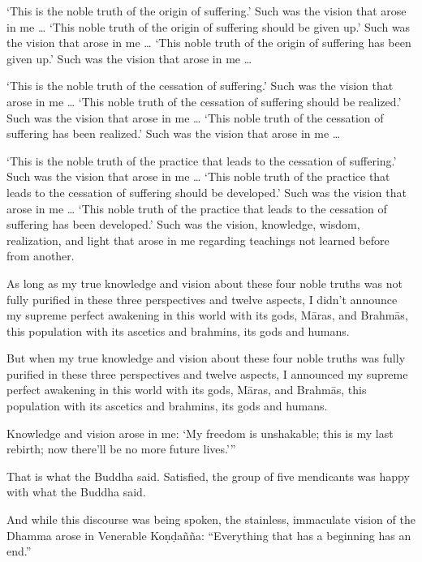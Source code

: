 \documentclass[12pt,openany]{book}%
\begin{document}
‘This is the noble truth of the origin of suffering.’ Such was the vision that arose in me … ‘This noble truth of the origin of suffering should be given up.’ Such was the vision that arose in me … ‘This noble truth of the origin of suffering has been given up.’ Such was the vision that arose in me … 

‘This is the noble truth of the cessation of suffering.’ Such was the vision that arose in me … ‘This noble truth of the cessation of suffering should be realized.’ Such was the vision that arose in me … ‘This noble truth of the cessation of suffering has been realized.’ Such was the vision that arose in me … 

‘This is the noble truth of the practice that leads to the cessation of suffering.’ Such was the vision that arose in me … ‘This noble truth of the practice that leads to the cessation of suffering should be developed.’ Such was the vision that arose in me … ‘This noble truth of the practice that leads to the cessation of suffering has been developed.’ Such was the vision, knowledge, wisdom, realization, and light that arose in me regarding teachings not learned before from another. 

As long as my true knowledge and vision about these four noble truths was not fully purified in these three perspectives and twelve aspects, I didn’t announce my supreme perfect awakening in this world with its gods, \textsanskrit{Māras}, and \textsanskrit{Brahmās}, this population with its ascetics and brahmins, its gods and humans. 

But when my true knowledge and vision about these four noble truths was fully purified in these three perspectives and twelve aspects, I announced my supreme perfect awakening in this world with its gods, \textsanskrit{Māras}, and \textsanskrit{Brahmās}, this population with its ascetics and brahmins, its gods and humans. 

Knowledge and vision arose in me: ‘My freedom is unshakable; this is my last rebirth; now there’ll be no more future lives.’” 

That is what the Buddha said. Satisfied, the group of five mendicants was happy with what the Buddha said. 

And while this discourse was being spoken, the stainless, immaculate vision of the Dhamma arose in Venerable \textsanskrit{Koṇḍañña}: “Everything that has a beginning has an end.” 
\end{document}

